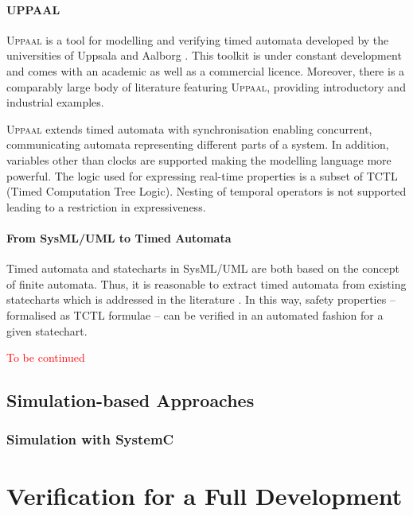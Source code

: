 \documentclass{template/openetcs_report}
\begin{document}
\paragraph{UPPAAL}

\textsc{Uppaal} is a tool for modelling and verifying timed automata developed by the universities of Uppsala and Aalborg \cite{UppaalTutorial04}. This toolkit is under constant development and comes with an academic as well as a commercial licence. Moreover, there is a comparably large body of literature featuring \textsc{Uppaal}, providing introductory and industrial examples. 

\textsc{Uppaal} extends timed automata with synchronisation enabling concurrent, communicating automata representing different parts of a system. In addition, variables other than clocks are supported making the modelling language more powerful. The logic used for expressing real-time properties is a subset of TCTL (Timed Computation Tree Logic). Nesting of temporal operators is not supported leading to a restriction in expressiveness.

\paragraph{From SysML/UML to Timed Automata}

Timed automata and statecharts in SysML/UML are both based on the concept of finite automata. Thus, it is reasonable to extract timed automata from existing statecharts which is addressed in the literature \cite{David2002, Knapp2002, Jensen2004}. In this way, safety properties -- formalised as TCTL formulae -- can be verified in an automated fashion for a given statechart.

\textcolor{red}{To be continued}



\subsection{Simulation-based Approaches}

\subsubsection{Simulation with SystemC}






\section{Verification for a Full Development}
\label{sec:verif-full-devel}
\end{document}
